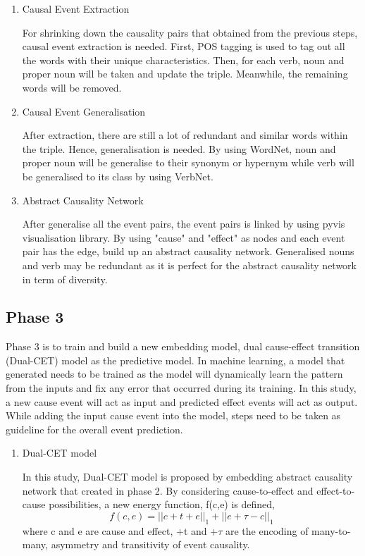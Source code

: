 \documentclass[twoside]{utmthesis}
\begin{document}
\begin{enumerate}[label=(\alph*)]
	\item Causal Event Extraction
	
	For shrinking down the causality pairs that obtained from the previous steps, causal event extraction is needed. First, POS tagging is used to tag out all the words with their unique characteristics. Then, for each verb, noun and proper noun will be taken and update the triple. Meanwhile, the remaining words will be removed. 
	
	\item Causal Event Generalisation
	
	After extraction, there are still a lot of redundant and similar words within the triple. Hence, generalisation is needed. By using WordNet, noun and proper noun will be generalise to their synonym or hypernym while verb will be generalised to its class by using VerbNet. 
	
	\item Abstract Causality Network
	
	After generalise all the event pairs, the event pairs is linked by using pyvis visualisation library. By using "cause" and "effect" as nodes and each event pair has the edge, build up an abstract causality network. Generalised nouns and verb may be redundant as it is perfect for the abstract causality network in term of diversity.  
	
	
\end{enumerate}
\subsection{Phase 3}
Phase 3 is to train and build a new embedding model, dual cause-effect transition (Dual-CET) model as the predictive model. 
In machine learning, a model that generated needs to be trained as the model will dynamically learn the pattern from the inputs and fix any error that occurred during its training. In this study, a new cause event will act as input and predicted effect events will act as output. While adding the input cause event into the model, steps need to be taken as guideline for the overall event prediction.  

\begin{enumerate}[label=(\alph*)]
	\item Dual-CET model 
	
	In this study, Dual-CET model is proposed by embedding abstract causality network that created in phase 2. By considering cause-to-effect and effect-to-cause possibilities, a new energy function, f(c,e) is defined, 
	\begin{equation}\label{3.2}
	f(c,e) = || c + t + e||_{1} + || e + \tau - c||_{1}
	\end{equation}where c and e are cause and effect, +t and +$\tau$ are the encoding of many-to-many, asymmetry and transitivity of event causality. 
	
	 

\end{enumerate}
\end{document}
